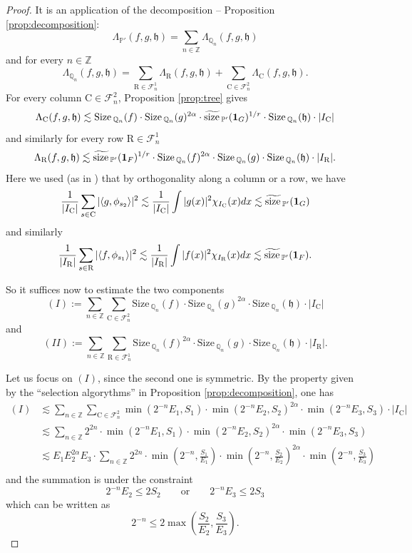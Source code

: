 \documentclass[a4paper,11pt,oneside]{amsart}
\newcommand{\hh}{\mathfrak{h}}
\newcommand{\PP}{\mathbb{P}}
\newcommand{\QQ}{\mathbb{Q}}
\newcommand{\FF}{\mathcal{F}}
\newcommand{\CC}{\mathrm{C}}
\newcommand{\RR}{\mathrm{R}}
\newcommand{\size}{\mathrm{Size\, }}
\newcommand{\ssize}{\widetilde{\mathrm{size}\,}}
\theoremstyle{plain}
\theoremstyle{definition}
\begin{document}
\begin{proof} It is an application of the decomposition -- Proposition \ref{prop:decomposition}:
$$ \Lambda_{\PP'}(f,g,\hh) = \sum_{n\in \mathbb{Z}} \Lambda_{\QQ_n}(f,g,\hh)$$
and for every $n\in {\mathbb Z}$
$$ \Lambda_{\QQ_n}(f,g,\hh) = \sum_{\RR \in \FF_n^1} \Lambda_{\RR}(f,g,\hh) + \sum_{\CC\in \FF_n^2} \Lambda_{\CC}(f,g,\hh).$$
For every column $\CC\in \FF_n^2$, Proposition \ref{prop:tree} gives
$$ \Lambda_{\CC}(f,g,\hh) \lesssim \size_{\QQ_n}(f) \cdot \size_{\QQ_n}(g)^{2\alpha} \cdot \ssize_{\PP'}({\bf 1}_G)^{1/r} \cdot \size_{\QQ_n}(\hh) \cdot |I_{\CC}|$$
and similarly for every row $\RR\in\FF_n^1$
$$ \Lambda_{\RR}(f,g,\hh) \lesssim \ssize_{\PP'}({\bf 1}_F)^{1/r} \cdot \size_{\QQ_n}(f)^{2\alpha} \cdot \size_{\QQ_n}(g) \cdot \size_{\QQ_n}(\hh) \cdot |I_{\RR}|.$$
Here we used (as in \cite[Proposition 2.7]{BB}) that by orthogonality along a column or a row, we have
$$ \frac{1}{|I_{\CC}|} \sum_{s\in\CC} |\langle g,\phi_{s_2}\rangle|^2 \lesssim \frac{1}{|I_{\CC}|}\int |g(x)|^2 \chi_{I_{\CC}}(x) dx \lesssim \ssize_{\PP'}({\bf 1}_{G})$$
and similarly
$$ \frac{1}{|I_{\RR}|} \sum_{s\in\RR} |\langle f,\phi_{s_1}\rangle|^2 \lesssim \frac{1}{|I_{\RR}|}\int |f(x)|^2 \chi_{I_{\RR}}(x) dx \lesssim \ssize_{\PP'}({\bf 1}_{F}).$$

So it suffices now to estimate the two components
$$ (I):= \sum_{n\in{\mathbb Z}} \sum_{\CC\in \FF_n^2} \size_{\QQ_n}(f) \cdot \size_{\QQ_n}(g)^{2\alpha} \cdot \size_{\QQ_n}(\hh) \cdot |I_{\CC}| $$
and
$$ (II):= \sum_{n\in{\mathbb Z}} \sum_{\RR\in \FF_n^1} \size_{\QQ_n}(f)^{2\alpha} \cdot \size_{\QQ_n}(g) \cdot \size_{\QQ_n}(\hh) \cdot |I_{\RR}|. $$

Let us focus on $(I)$, since the second one is symmetric. By the property given by the ``selection algorythms'' in Proposition \ref{prop:decomposition}, one has
\begin{align*}
(I) & \lesssim  \sum_{n\in{\mathbb Z}} \sum_{\CC\in \FF_n^2} \min(2^{-n}E_1,S_1) \cdot \min(2^{-n}E_2,S_2)^{2\alpha} \cdot \min(2^{-n}E_3,S_3) \cdot |I_{\CC}| \\
& \lesssim \sum_{n\in{\mathbb Z}}  2^{2n} \cdot \min(2^{-n}E_1,S_1) \cdot \min(2^{-n}E_2,S_2)^{2\alpha} \cdot \min(2^{-n}E_3,S_3) \\
& \lesssim E_1 E_2^{2\alpha} E_3 \cdot \sum_{n\in{\mathbb Z}}  2^{2n} \cdot \min(2^{-n},\frac{S_1}{E_1}) \cdot \min(2^{-n},\frac{S_2}{E_2})^{2\alpha} \cdot \min(2^{-n},\frac{S_3}{E_3}) \\
\end{align*}
and the summation is under the constraint
$$ 2^{-n} E_2 \leq 2 S_2 \qquad \textrm{or} \qquad 2^{-n} E_3 \leq 2 S_3$$
which can be written as
$$ 2^{-n}\leq 2\max( \frac{S_2}{E_2}, \frac{S_3}{E_3}).$$ 


\end{proof}
\end{document}

